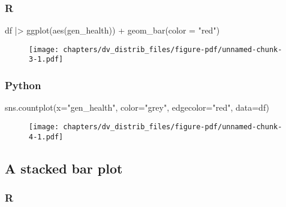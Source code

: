\documentclass[
  letterpaper,
  DIV=11,
  numbers=noendperiod]{scrreprt}
\newenvironment{Shaded}{\begin{snugshade}}{\end{snugshade}}
\newcommand{\AttributeTok}[1]{\textcolor[rgb]{0.40,0.46,0.14}{#1}}
\newcommand{\FunctionTok}[1]{\textcolor[rgb]{0.28,0.35,0.67}{#1}}
\newcommand{\NormalTok}[1]{\textcolor[rgb]{0.00,0.46,0.62}{#1}}
\newcommand{\OperatorTok}[1]{\textcolor[rgb]{0.37,0.37,0.37}{#1}}
\newcommand{\SpecialCharTok}[1]{\textcolor[rgb]{0.37,0.37,0.37}{#1}}
\newcommand{\StringTok}[1]{\textcolor[rgb]{0.13,0.47,0.30}{#1}}
\begin{document}
\hypertarget{r-43}{%
\subsubsection{R}\label{r-43}}

\begin{Shaded}
\begin{Highlighting}[]
\NormalTok{df }\SpecialCharTok{|\textgreater{}} 
    \FunctionTok{ggplot}\NormalTok{(}\FunctionTok{aes}\NormalTok{(gen\_health)) }\SpecialCharTok{+}
    \FunctionTok{geom\_bar}\NormalTok{(}\AttributeTok{color =} \StringTok{"red"}\NormalTok{)}
\end{Highlighting}
\end{Shaded}

\begin{figure}[H]

{\centering \texttt{[image: chapters/dv\_distrib\_files/figure-pdf/unnamed-chunk-3-1.pdf]}

}

\end{figure}

\hypertarget{python-43}{%
\subsubsection{Python}\label{python-43}}

\begin{Shaded}
\begin{Highlighting}[]
\NormalTok{sns.countplot(x}\OperatorTok{=}\StringTok{"gen\_health"}\NormalTok{, color}\OperatorTok{=}\StringTok{"grey"}\NormalTok{, edgecolor}\OperatorTok{=}\StringTok{"red"}\NormalTok{, data}\OperatorTok{=}\NormalTok{df)}
\end{Highlighting}
\end{Shaded}

\begin{figure}[H]

{\centering \texttt{[image: chapters/dv\_distrib\_files/figure-pdf/unnamed-chunk-4-1.pdf]}

}

\end{figure}

\hypertarget{a-stacked-bar-plot}{%
\subsection{A stacked bar plot}\label{a-stacked-bar-plot}}

\hypertarget{r-44}{%
\subsubsection{R}\label{r-44}}
\end{document}
